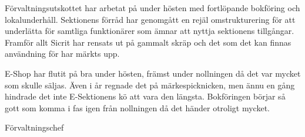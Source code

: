 \documentclass[../_main/handlingar.tex]{subfiles}
\begin{document}

Förvaltningsutskottet har arbetat på under hösten med fortlöpande bokföring och lokalunderhåll. Sektionens förråd har genomgått en rejäl omstrukturering för att underlätta för samtliga funktionärer som ämnar att nyttja sektionens tillgångar. Framför allt Sicrit har rensats ut på gammalt skräp och det som det kan finnas användning för har märkts upp. 

E-Shop har flutit på bra under hösten, främst under nollningen då det var mycket som skulle säljas. Även i år regnade det på märkespicknicken, men ännu en gång hindrade det inte E-Sektionens kö att vara den längsta. Bokföringen börjar så gott som komma i fas igen från nollningen då det händer otroligt mycket. 

\begin{signatures}{1}
    \mvh
    \signature{Magnus Lundh}{Förvaltningschef}
\end{signatures}
\end{document}
